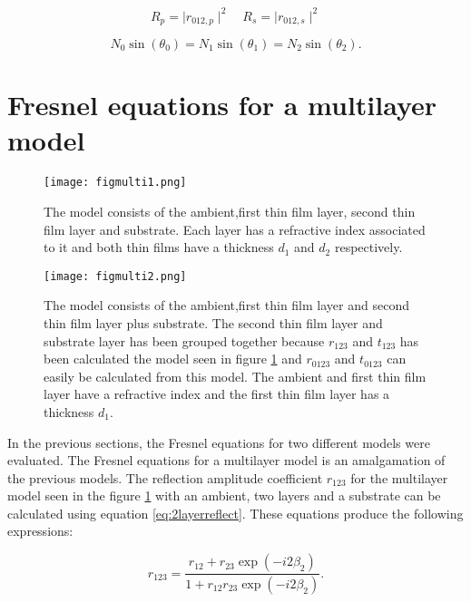 \documentclass[MasterThesisMain.tex]{subfiles}
\begin{document}
\begin{equation}
R_p=\mid r_{012,p} \mid^2 \quad R_s=\mid r_{012,s} \mid^2
\end{equation}

\begin{equation}
N_0\sin(\theta_0)=N_1\sin(\theta_1)=N_2\sin(\theta_2).
\end{equation} 

\section{Fresnel equations for a multilayer model}\label{ch:fresnelmulti} 

\begin{figure}
\centering
\texttt{[image: figmulti1.png]}
\caption{The model consists of the ambient,first thin film layer, second thin film layer and substrate. Each layer has a refractive index associated to it and both thin films have a thickness $d_1$ and $d_2$ respectively.}
\label{fig:multilayer1}
\end{figure}

\begin{figure}
\centering
\texttt{[image: figmulti2.png]}
\caption{The model consists of the ambient,first thin film layer and second thin film layer plus substrate. The second thin film layer and substrate layer has been grouped together because $r_{123}$ and $t_{123}$ has been calculated the model seen in figure \ref{fig:multilayer1} and $r_{0123}$ and $t_{0123}$ can easily be calculated from this model. The ambient and first thin film layer have a refractive index and the first thin film layer has a thickness $d_1$.}
\label{fig:multilayer2}
\end{figure}


In the previous sections, the Fresnel equations for two different models were evaluated. The Fresnel equations for a multilayer model is an amalgamation of the previous models. The reflection amplitude coefficient $r_{123}$ for the multilayer model seen in the figure \ref{fig:multilayer1} with an ambient, two layers and a substrate can be calculated using equation \ref{eq:2layerreflect}. These equations produce the following expressions:

\begin{equation}
r_{123}= \frac{r_{12}+r_{23}\exp(-i2\beta_2)}{1+r_{12}r_{23}\exp(-i2\beta_2)}.
\end{equation}
\end{document}
